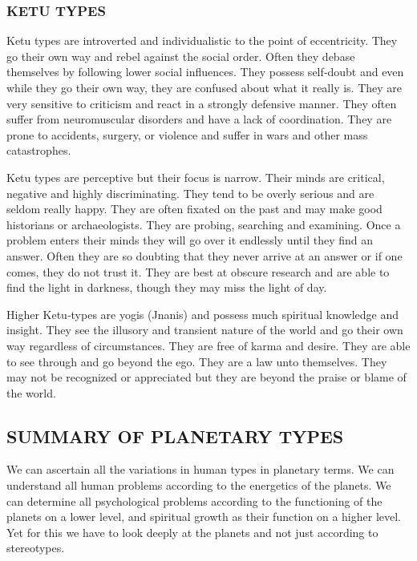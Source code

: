  



\subsubsection{KETU TYPES}
 

Ketu types are introverted and individualistic to the point of eccentricity. They go their own way and rebel against the social order. Often they debase themselves by following lower social influences. They possess self‑doubt and even while they go their own way, they are confused about what it really is. They are very sensitive to criticism and react in a strongly defensive manner. They often suffer from neuromuscular disorders and have a lack of coordination. They are prone to accidents, surgery, or violence and suffer in wars and other mass catastrophes.

 

Ketu types are perceptive but their focus is narrow. Their minds are critical, negative and highly discriminating. They tend to be overly serious and are seldom really happy. They are often fixated on the past and may make good historians or archaeologists. They are probing, searching and examining. Once a problem enters their minds they will go over it endlessly until they find an answer. Often they are so doubting that they never arrive at an answer or if one comes, they do not trust it. They are best at obscure research and are able to find the light in darkness, though they may miss the light of day.

 

Higher Ketu‑types are yogis (Jnanis) and possess much spiritual knowledge and insight. They see the illusory and transient nature of the world and go their own way regardless of circumstances. They are free of karma and desire. They are able to see through and go beyond the ego. They are a law unto themselves. They may not be recognized or appreciated but they are beyond the praise or blame of the world.

 

 

\subsection{SUMMARY OF PLANETARY TYPES}
 

We can ascertain all the variations in human types in planetary terms. We can understand all human problems according to the energetics of the planets. We can determine all psychological problems according to the functioning of the planets on a lower level, and spiritual growth as their function on a higher level. Yet for this we have to look deeply at the planets and not just according to stereotypes.

